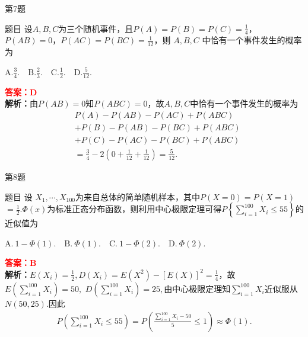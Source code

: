 \documentclass[aspectratio=169]{beamer}
\begin{document}
\begin{frame}{第7题}
\begin{block}{题目}
设$A,B,C$为三个随机事件，且$P(A)=P(B)=P(C)=\frac14$，$P(AB)=0$，$P(AC)=P(BC)=\frac1{12}$，则 $A,B,C$ 中恰有一个事件发生的概率为

$\mathrm{A.}\frac34. \quad \mathrm{B.}\frac23. \quad \mathrm{C.}\frac12. \quad \mathrm{D.}\frac5{12}$.
\end{block}
\textcolor{red}{\textbf{答案：}$\mathbf{D}$} \\
\textbf{解析：}由$P(AB)=0$知$P(ABC)=0$，故$A,B,C$中恰有一个事件发生的概率为
\begin{align*}
&P\left( A \right) -P\left( AB \right) -P\left( AC \right) +P\left( ABC \right) 
\\
&+P\left( B \right) -P\left( AB \right) -P\left( BC \right) +P\left( ABC \right) 
\\
&+P\left( C \right) -P\left( AC \right) -P\left( BC \right) +P\left( ABC \right) 
\\
&=\frac{3}{4}-2\left( 0+\frac{1}{12}+\frac{1}{12} \right) =\frac{5}{12}.
\end{align*}
\end{frame}

\begin{frame}{第8题}
\begin{block}{题目}
设 $X_1,\cdots,X_{100}$为来自总体的简单随机样本，其中$P(X=0)$$=$$P(X=1)$$=$$\frac12$.$\Phi(x)$为标准正态分布函数，则利用中心极限定理可得$P\left\{ \sum_{i=1}^{100}{X_i}\leqslant 55 \right\}$的近似值为

$\mathrm{A.}\ 1-\Phi(1).\quad \mathrm{B.}\ \Phi(1).\quad \mathrm{C.}\ 1-\Phi(2).\quad \mathrm{D.}\ \Phi(2)$.
\end{block}
\textcolor{red}{\textbf{答案：}$\mathbf{B}$} \\
\textbf{解析：}$E(X_i)=\frac12,D(X_i)=E(X^2)-\left[E(X)\right]^2=\frac14$，故 $E\left( \sum_{i=1}^{100}{X_i} \right) =50,$ $D\left( \sum_{i=1}^{100}{X_i} \right) =25,$由中心极限定理知$\sum_{i=1}^{100}{X_i}$近似服从$N(50,25)$.因此
{\scriptsize
\begin{align*}
\textstyle
P\!\left(\sum\limits_{i=1}^{100}X_i\leqslant 55\right)
=
P\!\left(\frac{\sum\limits_{i=1}^{100}X_i-50}{5}\leqslant 1\right)
\approx \Phi(1).
\end{align*}}
\end{frame}

\end{document}
